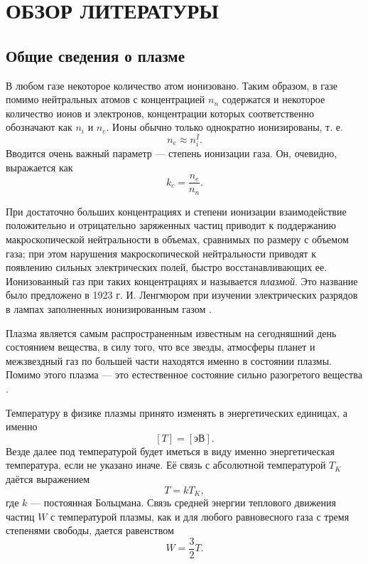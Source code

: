 \chapter{ОБЗОР ЛИТЕРАТУРЫ}\label{ch1}


\section{Общие сведения о плазме}

В любом газе некоторое количество атом ионизовано. Таким образом, в газе помимо нейтральных атомов с концентрацией $n_n$ содержатся и некоторое количество ионов и электронов, концентрации которых соответственно обозначают как $n_i$ и $n_e$. Ионы обычно только однократно ионизированы, т. е.
\begin{equation}
n_e \approx n_i^I.
\end{equation}
Вводится очень важный параметр --- степень ионизации газа. Он, очевидно, выражается как
\begin{equation}
k_c = \frac{n_e}{n_n}.
\end{equation}

При достаточно больших концентрациях и степени ионизации взаимодействие положительно и отрицательно заряженных частиц приводит к поддержанию макроскопической нейтральности в объемах, сравнимых по размеру с объемом газа; при этом нарушения макроскопической нейтральности приводят к появлению сильных электрических полей, быстро восстанавливающих ее. Ионизованный газ при таких концентрациях и называется \textit{плазмой}. Это название было предложено в 1923 г. И. Ленгмюром при изучении электрических разрядов в лампах заполненных ионизированным газом \cite{golant,kotelnikov2008}.


Плазма является самым распространенным известным на сегодняшний день состоянием вещества, в силу того, что все звезды, атмосферы планет и межзвездный газ по большей части находятся именно в состоянии плазмы. Помимо этого плазма --- это естественное состояние сильно разогретого вещества \cite{golant,archenovich}.

Температуру в физике плазмы принято изменять в энергетических единицах, а именно
\begin{equation}
\left[T\right] = \left[\text{эВ}\right].
\end{equation}
Везде далее под температурой будет иметься в виду именно энергетическая температура, если не указано иначе. Её связь с абсолютной температурой $T_K$ даётся выражением
\begin{equation}
T = k T_K,
\end{equation}
где $k$ --- постоянная Больцмана. Связь средней энергии теплового движения частиц $W$ с температурой плазмы, как и для любого равновесного газа с тремя степенями свободы, дается равенством
\begin{equation}
W = \frac{3}{2} T.
\end{equation}

